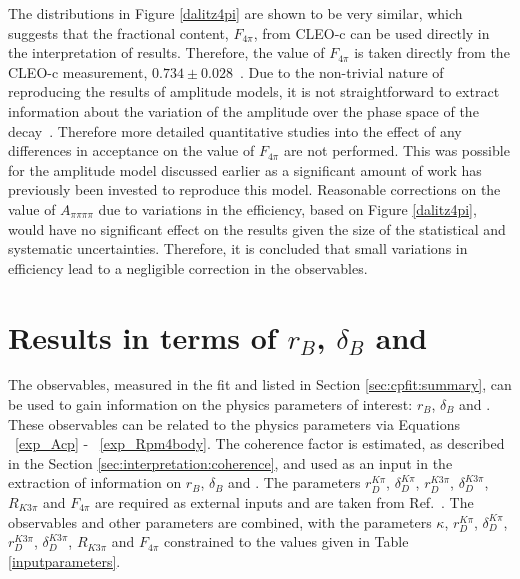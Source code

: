 The distributions in Figure \ref{dalitz4pi} are shown to be very similar, which suggests that the fractional \CP content, $F_{4\pi}$, from CLEO-c can be used directly in the interpretation of \lhcb results. Therefore, the value of $F_{4\pi}$ is taken directly from the CLEO-c measurement, $0.734 \pm 0.028$~\cite{charm4pi}. Due to the non-trivial nature of reproducing the results of amplitude models, it is not straightforward to extract information about the variation of the amplitude over the phase space of the \decay{\Dz}{\pim\pip\pim\pip} decay~\cite{4piamplitude}. Therefore more detailed quantitative studies into the effect of any differences in acceptance on the value of $F_{4\pi}$ are not performed. This was possible for the \kpipipi amplitude model discussed earlier as a significant amount of work has previously been invested to reproduce this model. Reasonable corrections on the value of $A_{\pi\pi\pi\pi}$ due to variations in the \pipipipi efficiency, based on Figure \ref{dalitz4pi}, would have no significant effect on the results given the size of the statistical and systematic uncertainties. Therefore, it is concluded that small variations in efficiency lead to a negligible correction in the observables. 


\section{Results in terms of $r_B$, $\delta_B$ and \Pgamma}
\label{sec:interpretation:gammadini}

The \CP observables, measured in the \CP fit and listed in Section \ref{sec:cpfit:summary}, can be used to gain information on the physics parameters of interest: $r_B$, $\delta_B$ and \Pgamma. These observables can be related to the physics parameters via Equations ~\ref{exp_Acp} - ~\ref{exp_Rpm4body}. The coherence factor is estimated, as described in the Section \ref{sec:interpretation:coherence}, and used as an input in the extraction of information on $r_B$, $\delta_B$ and \Pgamma. The parameters $r_D^{K\pi}$, $\delta_D^{K\pi}$, $r_D^{K3\pi}$, $\delta_D^{K3\pi}$, $R_{K3\pi}$ and $F_{4\pi}$ are required as external inputs and are taken from Ref.~\cite{HFAG,charmk3pi,charmk3pi_errata,LHCb-PAPER-2015-057,charm4pi}. The \CP observables and other parameters are combined, with the parameters $\kappa$, $r_D^{K\pi}$, $\delta_D^{K\pi}$, $r_D^{K3\pi}$, $\delta_D^{K3\pi}$, $R_{K3\pi}$ and $F_{4\pi}$ constrained to the values given in Table \ref{inputparameters}. 

